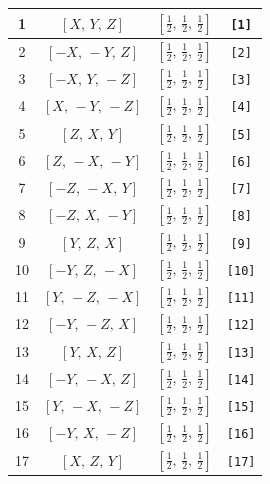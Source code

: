 \documentclass[fleqn,8pt]{jsarticle}
\begin{document}
\begin{longtable}{cccc}
1 & $\left[ X,\, Y,\, Z \right]$ & $\left[ \frac{1}{2},\, \frac{1}{2},\, \frac{1}{2} \right]$ & {\tt [1]} \\ \hline
2 & $\left[ - X,\, - Y,\, Z \right]$ & $\left[ \frac{1}{2},\, \frac{1}{2},\, \frac{1}{2} \right]$ & {\tt [2]} \\ \hline
3 & $\left[ - X,\, Y,\, - Z \right]$ & $\left[ \frac{1}{2},\, \frac{1}{2},\, \frac{1}{2} \right]$ & {\tt [3]} \\ \hline
4 & $\left[ X,\, - Y,\, - Z \right]$ & $\left[ \frac{1}{2},\, \frac{1}{2},\, \frac{1}{2} \right]$ & {\tt [4]} \\ \hline
5 & $\left[ Z,\, X,\, Y \right]$ & $\left[ \frac{1}{2},\, \frac{1}{2},\, \frac{1}{2} \right]$ & {\tt [5]} \\ \hline
6 & $\left[ Z,\, - X,\, - Y \right]$ & $\left[ \frac{1}{2},\, \frac{1}{2},\, \frac{1}{2} \right]$ & {\tt [6]} \\ \hline
7 & $\left[ - Z,\, - X,\, Y \right]$ & $\left[ \frac{1}{2},\, \frac{1}{2},\, \frac{1}{2} \right]$ & {\tt [7]} \\ \hline
8 & $\left[ - Z,\, X,\, - Y \right]$ & $\left[ \frac{1}{2},\, \frac{1}{2},\, \frac{1}{2} \right]$ & {\tt [8]} \\ \hline
9 & $\left[ Y,\, Z,\, X \right]$ & $\left[ \frac{1}{2},\, \frac{1}{2},\, \frac{1}{2} \right]$ & {\tt [9]} \\ \hline
10 & $\left[ - Y,\, Z,\, - X \right]$ & $\left[ \frac{1}{2},\, \frac{1}{2},\, \frac{1}{2} \right]$ & {\tt [10]} \\ \hline
11 & $\left[ Y,\, - Z,\, - X \right]$ & $\left[ \frac{1}{2},\, \frac{1}{2},\, \frac{1}{2} \right]$ & {\tt [11]} \\ \hline
12 & $\left[ - Y,\, - Z,\, X \right]$ & $\left[ \frac{1}{2},\, \frac{1}{2},\, \frac{1}{2} \right]$ & {\tt [12]} \\ \hline
13 & $\left[ Y,\, X,\, Z \right]$ & $\left[ \frac{1}{2},\, \frac{1}{2},\, \frac{1}{2} \right]$ & {\tt [13]} \\ \hline
14 & $\left[ - Y,\, - X,\, Z \right]$ & $\left[ \frac{1}{2},\, \frac{1}{2},\, \frac{1}{2} \right]$ & {\tt [14]} \\ \hline
15 & $\left[ Y,\, - X,\, - Z \right]$ & $\left[ \frac{1}{2},\, \frac{1}{2},\, \frac{1}{2} \right]$ & {\tt [15]} \\ \hline
16 & $\left[ - Y,\, X,\, - Z \right]$ & $\left[ \frac{1}{2},\, \frac{1}{2},\, \frac{1}{2} \right]$ & {\tt [16]} \\ \hline
17 & $\left[ X,\, Z,\, Y \right]$ & $\left[ \frac{1}{2},\, \frac{1}{2},\, \frac{1}{2} \right]$ & {\tt [17]} \\ \hline

\end{longtable}
\end{document}
